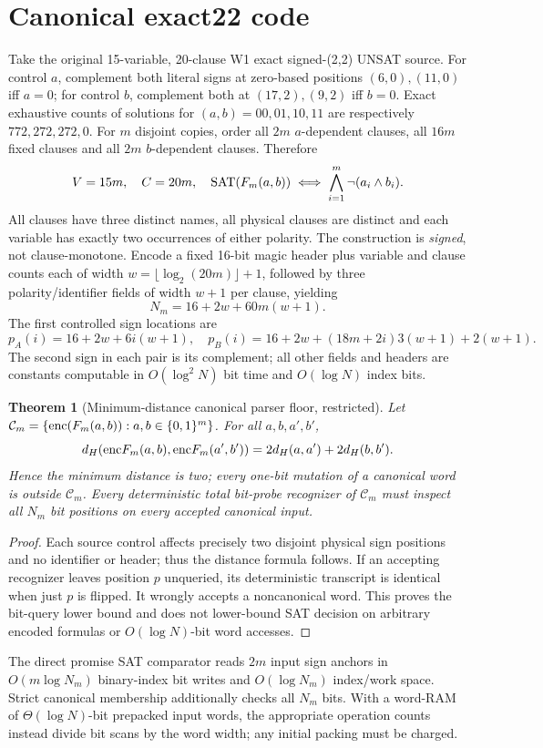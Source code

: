 \documentclass[11pt]{article}
\newtheorem{theorem}{Theorem}
\begin{document}
\section{Canonical exact22 code}
Take the original 15-variable, 20-clause W1 exact signed-(2,2) UNSAT source. For control $a$, complement both literal signs at zero-based positions $(6,0),(11,0)$ iff $a=0$; for control $b$, complement both at $(17,2),(9,2)$ iff $b=0$. Exact exhaustive counts of solutions for $(a,b)=00,01,10,11$ are respectively $772,272,272,0$. For $m$ disjoint copies, order all $2m$ $a$-dependent clauses, all $16m$ fixed clauses and all $2m$ $b$-dependent clauses. Therefore
\[
V=15m,\quad C=20m,\quad {\rm SAT}(F_m(a,b))\iff \bigwedge_{i=1}^m \neg(a_i\wedge b_i).
\]
All clauses have three distinct names, all physical clauses are distinct and each variable has exactly two occurrences of either polarity. The construction is \emph{signed}, not clause-monotone. Encode a fixed 16-bit magic header plus variable and clause counts each of width $w=\lfloor\log_2(20m)\rfloor+1$, followed by three polarity/identifier fields of width $w+1$ per clause, yielding
\[
N_m=16+2w+60m(w+1).
\]
The first controlled sign locations are
\[
p_A(i)=16+2w+6i(w+1),\quad
p_B(i)=16+2w+(18m+2i)3(w+1)+2(w+1).
\]
The second sign in each pair is its complement; all other fields and headers are constants computable in $O(\log^2N)$ bit time and $O(\log N)$ index bits.

\begin{theorem}[Minimum-distance canonical parser floor, restricted]
Let $\mathcal C_m=\{{\rm enc}(F_m(a,b)):a,b\in\{0,1\}^m\}$. For all $a,b,a',b'$,
\[
d_H({\rm enc}F_m(a,b),{\rm enc}F_m(a',b'))=
2d_H(a,a')+2d_H(b,b').
\]
Hence the minimum distance is two; every one-bit mutation of a canonical word is outside $\mathcal C_m$. Every deterministic total \emph{bit-probe} recognizer of $\mathcal C_m$ must inspect all $N_m$ bit positions on every accepted canonical input.
\end{theorem}
\begin{proof}
Each source control affects precisely two disjoint physical sign positions and no identifier or header; thus the distance formula follows. If an accepting recognizer leaves position $p$ unqueried, its deterministic transcript is identical when just $p$ is flipped. It wrongly accepts a noncanonical word. This proves the bit-query lower bound and does not lower-bound SAT decision on arbitrary encoded formulas or $O(\log N)$-bit word accesses.
\end{proof}
The direct promise SAT comparator reads $2m$ input sign anchors in $O(m\log N_m)$ binary-index bit writes and $O(\log N_m)$ index/work space. Strict canonical membership additionally checks all $N_m$ bits. With a word-RAM of $\Theta(\log N)$-bit prepacked input words, the appropriate operation counts instead divide bit scans by the word width; any initial packing must be charged.
\end{document}

